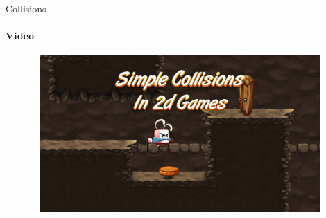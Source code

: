 \documentclass[aspectratio=169,notes]{beamer}
\begin{document}
\begin{frame}[t]{Collisions}
    \framesubtitle{Video}
    \vspace{-0.6cm}
    \begin{figure}[H]
        \href{https://youtu.be/aTbw71EpamY}{
            \centering\includegraphics[height=6cm,width=1\textwidth,keepaspectratio]{collisions.jpg}}
        \label{fig:collisions.jpg}
    \end{figure}
\end{frame}
\end{document}
